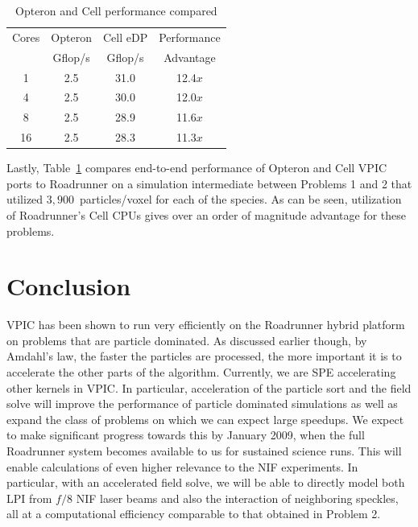 \documentclass[journal,twoside]{IEEEtran}
\newcommand{\tbl}[1]{Table~\ref{tbl:#1}}
\begin{document}
\begin{table}
\caption{Opteron and Cell performance compared}
\begin{center}
\begin{tabular}{c c c c}
\hline
\hline
Cores & Opteron & Cell eDP & Performance \\
      & Gflop/s &  Gflop/s &  Advantage  \\
\hline
    1 &     2.5 &     31.0 &     12.4$x$ \\
    4 &     2.5 &     30.0 &     12.0$x$ \\
    8 &     2.5 &     28.9 &     11.6$x$ \\
   16 &     2.5 &     28.3 &     11.3$x$ \\
\hline
\end{tabular}
\end{center}
\label{tbl:opteron-cell-compared}
\end{table}

Lastly, \tbl{opteron-cell-compared} compares end-to-end performance of
Opteron and Cell VPIC ports to Roadrunner on a simulation intermediate
between Problems 1 and 2 that utilized $3,900$~particles/voxel for
each of the species.  As can be seen, utilization of Roadrunner's Cell
CPUs gives over an order of magnitude advantage for these problems.

\section{Conclusion}

VPIC has been shown to run very efficiently on the Roadrunner hybrid
platform on problems that are particle dominated.  As discussed
earlier though, by Amdahl's law, the faster the particles are
processed, the more important it is to accelerate the other parts of
the algorithm.  Currently, we are SPE accelerating other kernels in
VPIC.  In particular, acceleration of the particle sort and the field
solve will improve the performance of particle dominated simulations
as well as expand the class of problems on which we can expect large
speedups.  We expect to make significant progress towards this by
January 2009, when the full Roadrunner system becomes available to us
for sustained science runs.  This will enable calculations of even
higher relevance to the NIF experiments. In particular, with an
accelerated field solve, we will be able to directly model both LPI from
$f/8$ NIF laser beams and also the interaction of neighboring speckles,
all at a computational efficiency comparable to
that obtained in Problem 2.
\end{document}
